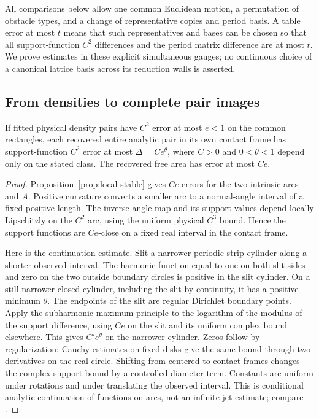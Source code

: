 All comparisons below allow one common Euclidean motion, a permutation
of obstacle types, and a change of representative copies and period basis.
A table error at most $t$ means that such representatives and bases can
be chosen so that all support-function $C^2$ differences and the period
matrix difference are at most $t$. We prove estimates in these explicit
simultaneous gauges; no continuous choice of a canonical lattice basis
across its reduction walls is asserted.

\subsection{From densities to complete pair images}
\begin{lemma}\label{lem:pair-error}
If fitted physical density pairs have $C^2$ error at most $e<1$ on
the common rectangles, each recovered entire analytic pair in its own
contact frame has support-function $C^2$ error at most
$\Delta=C e^\theta$, where $C>0$ and $0<\theta<1$ depend only
on the stated class. The recovered free area has error at most $Ce$.
\end{lemma}
\begin{proof}
Proposition~\ref{prop:local-stable} gives $Ce$ errors for the two
intrinsic arcs and $A$. Positive curvature converts a smaller arc to
a normal-angle interval of a fixed positive length. The inverse angle
map and its support values depend locally Lipschitzly on the $C^2$ arc,
using the uniform physical $C^3$ bound. Hence the support functions
are $Ce$-close on a fixed real interval in the contact frame.

Here is the continuation estimate. Slit a narrower periodic strip
cylinder along a shorter observed interval. The harmonic function equal
to one on both slit sides and zero on the two outside boundary circles
is positive in the slit cylinder. On a still narrower closed cylinder,
including the slit by continuity, it has a positive minimum $\theta$.
The endpoints of the slit are regular Dirichlet boundary points.
Apply the subharmonic maximum principle to the logarithm of the modulus
of the support difference, using $Ce$ on the slit and its uniform
complex bound elsewhere. This gives $C'e^\theta$ on the narrower
cylinder. Zeros follow by regularization; Cauchy estimates on fixed
disks give the same bound through two derivatives on the real circle.
Shifting from centered to contact frames changes the complex support
bound by a controlled diameter term. Constants are uniform under rotations
and under translating the observed interval. This is conditional analytic
continuation of functions on arcs, not an infinite jet estimate; compare
\cite{Trefethen}.
\end{proof}

